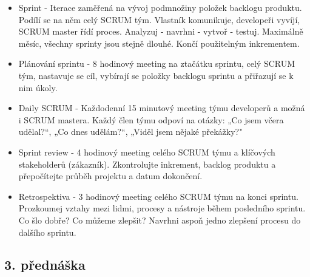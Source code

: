 \documentclass[11pt,a4paper]{article}
\begin{document}
        \begin{itemize}
            \item Sprint - Iterace zaměřená na vývoj podmnožiny položek backlogu produktu. Podílí se na něm celý SCRUM tým. Vlastník komunikuje, developeři vyvíjí, SCRUM master řídí proces. Analyzuj - navrhni - vytvoř - testuj. Maximálně měsíc, všechny sprinty jsou stejně dlouhé. Končí použitelným inkrementem.
            \item Plánování sprintu - 8 hodinový meeting na ztačátku sprintu, celý SCRUM tým, nastavuje se cíl, vybírají se položky backlogu sprintu a přiřazují se k nim úkoly.
            \item Daily SCRUM - Každodenní 15 minutový meeting týmu developerů a možná i SCRUM mastera. Každý člen týmu odpoví na otázky: „Co jsem včera udělal?“, „Co dnes udělám?“, „Viděl jsem nějaké překážky?"
            \item Sprint review - 4 hodinový meeting celého SCRUM týmu a klíčových stakeholderů (zákazník). Zkontrolujte inkrement, backlog produktu a přepočítejte průběh projektu a datum dokončení.
            \item Retrospektiva - 3 hodinový meeting celého SCRUM týmu na konci sprintu. Prozkoumej vztahy mezi lidmi, procesy a nástroje během posledního sprintu. Co šlo dobře? Co můžeme zlepšit? Navrhni aspoň jedno zlepšení procesu do dalšího sprintu.
        \end{itemize}

    \subsection{3. přednáška \cite{pres-3b}}
\end{document}
